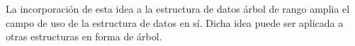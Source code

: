 La incorporación de esta idea a la estructura de datos árbol de rango amplia el campo de uso de la estructura de datos en sí. Dicha idea puede ser aplicada a otras estructuras en forma de árbol.